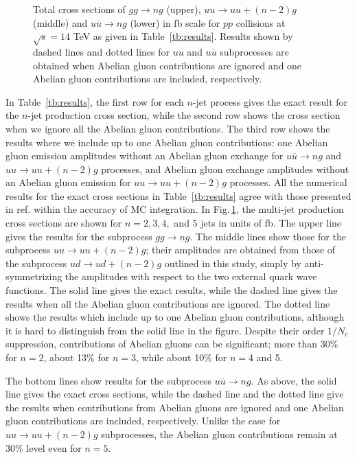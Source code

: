 \begin{figure}
\caption{Total cross sections of $gg\rightarrow ng$ (upper),
 $uu\rightarrow uu+(n-2)g$ (middle) and
 $u\overline{u}\rightarrow ng$ (lower)
 in fb scale for $pp$ collisions at
 $\sqrt{s}=14$ TeV as given in Table~\ref{tb:results}.
 Results shown by dashed lines and dotted lines for $uu$ and $u\overline{u}$
 subprocesses are obtained when Abelian gluon contributions
 are ignored and one Abelian gluon contributions are included, respectively.}
\label{fig:results}
\end{figure}
In Table~\ref{tb:results}, the first row for each $n$-jet process gives the
 exact result for the $n$-jet production cross section, while the
 second row shows the cross section when we ignore all the Abelian
 gluon contributions. The third row shows the results where we include up to one Abelian
 gluon contributions: one Abelian gluon emission amplitudes without an
 Abelian gluon exchange for $u\overline{u}\rightarrow ng$ and $uu\rightarrow
 uu+(n-2)g$ processes, and Abelian gluon
 exchange amplitudes without an Abelian gluon emission for $uu\rightarrow
 uu+(n-2)g$ processes.
 All the numerical results for the exact cross
 sections in Table~\ref{tb:results}
 agree with those
 presented in ref.\cite{GPU2} within the accuracy of MC integration.
 In Fig.\,\ref{fig:results}, the multi-jet production cross sections
 are shown for $n=2, 3, 4,$ and 5 jets in units of fb.
 The upper line gives the results for the subprocess $gg\rightarrow ng$.
 The middle lines show those for the subprocess
 $uu\rightarrow uu+(n-2)g$; their amplitudes are obtained from those of
 the
 subprocess
 $ud\rightarrow ud+(n-2)g$ outlined in this study,
 simply by anti-symmetrizing the amplitudes with respect
 to the two external quark wave functions. The solid line gives the
 exact results, while the dashed line gives
 the results when all the Abelian gluon contributions are
 ignored. The dotted line shows the results which include up to one Abelian gluon
 contributions, although it is hard to distinguish from the solid line
 in the figure. Despite their order $1/N_c$ suppression, contributions of Abelian gluons can be significant;
 more than 30\% for $n=2$, about 13\% for $n=3$, while
 about 10\% for $n=$4 and 5.

 The bottom lines show results for the subprocess
 $u\overline{u}\rightarrow ng$. As above, the solid line gives
 the exact cross sections, while
 the dashed line and the dotted line give the results when contributions
 from Abelian gluons are ignored and one Abelian gluon contributions are
 included, respectively.
Unlike the case for $uu \to uu+(n-2)g$ subprocesses,
 the Abelian gluon contributions remain at 30\% level
 even for $n=5$.


